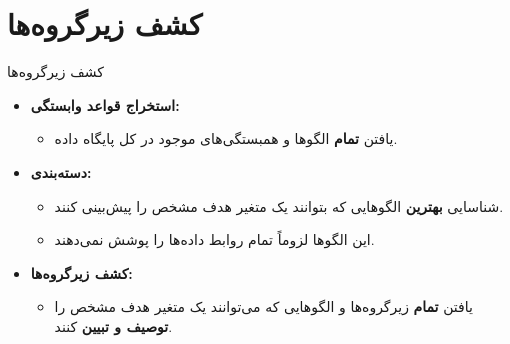 \section{کشف زیرگروه‌ها}

\begin{frame}{کشف زیرگروه‌ها}{}
\begin{itemize}\setlength{\itemsep}{6pt}
    \item \textbf{استخراج قواعد وابستگی:} 
    \begin{itemize}\setlength{\itemsep}{2pt}
        \item یافتن \textbf{تمام} الگوها و همبستگی‌های موجود در کل پایگاه داده.
    \end{itemize}
    \item \textbf{دسته‌بندی:} 
    \begin{itemize}\setlength{\itemsep}{2pt}
        \item شناسایی \textbf{بهترین} الگوهایی که بتوانند یک متغیر هدف مشخص را پیش‌بینی کنند.
        \item این الگوها لزوماً تمام روابط داده‌ها را پوشش نمی‌دهند.
    \end{itemize}
    \item \textbf{کشف زیرگروه‌ها:} 
    \begin{itemize}\setlength{\itemsep}{2pt}
        \item یافتن \textbf{تمام} زیرگروه‌ها و الگوهایی که می‌توانند یک متغیر هدف مشخص را \textbf{توصیف و تبیین} کنند.
    \end{itemize}
\end{itemize}
\end{frame}

